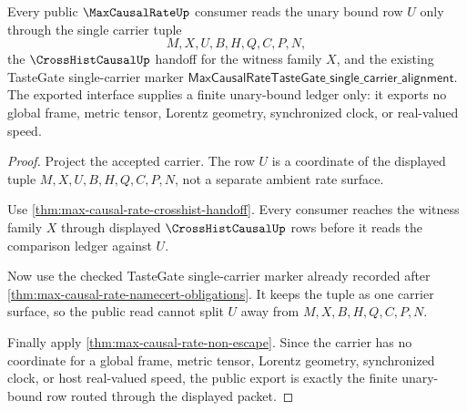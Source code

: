 \begin{theorem}
\label{thm:max-causal-rate-public-unary-bound-export}
Every public $\MaxCausalRateUp$ consumer reads the unary bound row $U$ only through the single carrier tuple
$$
M,X,U,B,H,Q,C,P,N,
$$
the $\CrossHistCausalUp$ handoff for the witness family $X$, and the existing TasteGate single-carrier marker $\mathsf{MaxCausalRateTasteGate\_single\_carrier\_alignment}$. The exported interface supplies a finite unary-bound ledger only: it exports no global frame, metric tensor, Lorentz geometry, synchronized clock, or real-valued speed.
\end{theorem}
\begin{proof}
Project the accepted carrier. The row $U$ is a coordinate of the displayed tuple $M,X,U,B,H,Q,C,P,N$, not a separate ambient rate surface.

Use \autoref{thm:max-causal-rate-crosshist-handoff}. Every consumer reaches the witness family $X$ through displayed $\CrossHistCausalUp$ rows before it reads the comparison ledger against $U$.

Now use the checked TasteGate single-carrier marker already recorded after \autoref{thm:max-causal-rate-namecert-obligations}. It keeps the tuple as one carrier surface, so the public read cannot split $U$ away from $M,X,B,H,Q,C,P,N$.

Finally apply \autoref{thm:max-causal-rate-non-escape}. Since the carrier has no coordinate for a global frame, metric tensor, Lorentz geometry, synchronized clock, or host real-valued speed, the public export is exactly the finite unary-bound row routed through the displayed packet.
\end{proof}

